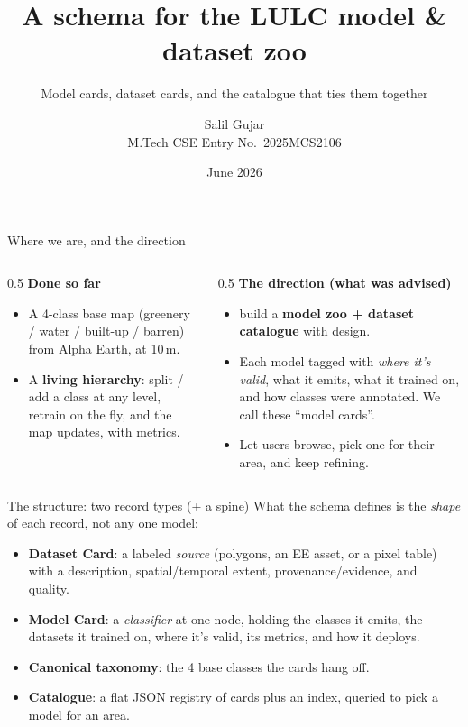 \documentclass[aspectratio=169]{beamer}
\title[Model \& Dataset cards for LULC]{A schema for the LULC model \& dataset zoo}
\subtitle{Model cards, dataset cards, and the catalogue that ties them together}
\author[Salil Gujar]{Salil Gujar \\ \footnotesize M.Tech CSE \quad Entry No.\ 2025MCS2106}
\date{June 2026}
\begin{document}
\frame{\titlepage}

\begin{frame}{Where we are, and the direction}
\begin{columns}[T]
\begin{column}{0.5\textwidth}
\textbf{Done so far}
\begin{itemize}\small
  \item A 4-class base map (greenery / water / built-up / barren) from Alpha Earth, at 10\,m.
  \item A \textbf{living hierarchy}: split / add a class at any level, retrain on the fly,
  and the map updates, with metrics.
\end{itemize}
\end{column}
\begin{column}{0.5\textwidth}
\textbf{The direction (what was advised)}
\begin{itemize}\small
  \item build a \textbf{model zoo + dataset catalogue} with design.
  \item Each model tagged with \emph{where it's valid}, what it emits, what it trained on,
  and how classes were annotated. We call these ``model cards''.
  \item Let users browse, pick one for their area, and keep refining.
\end{itemize}
\end{column}
\end{columns}
\vspace{0.6em}
\centering
\end{frame}

\begin{frame}{The structure: two record types (+ a spine)}
What the schema defines is the \emph{shape} of each record, not any one model:
\begin{itemize}
  \item \textbf{Dataset Card}: a labeled \emph{source} (polygons, an EE asset, or a pixel
  table) with a description, spatial/temporal extent, provenance/evidence, and quality.
  \item \textbf{Model Card}: a \emph{classifier} at one node, holding the classes it emits,
  the datasets it trained on, where it's valid, its metrics, and how it deploys.
  \item \textbf{Canonical taxonomy}: the 4 base classes the cards hang off.
  \item \textbf{Catalogue}: a flat JSON registry of cards plus an index, queried to pick a
  model for an area.
\end{itemize}
\vspace{0.5em}

\end{frame}
\end{document}

